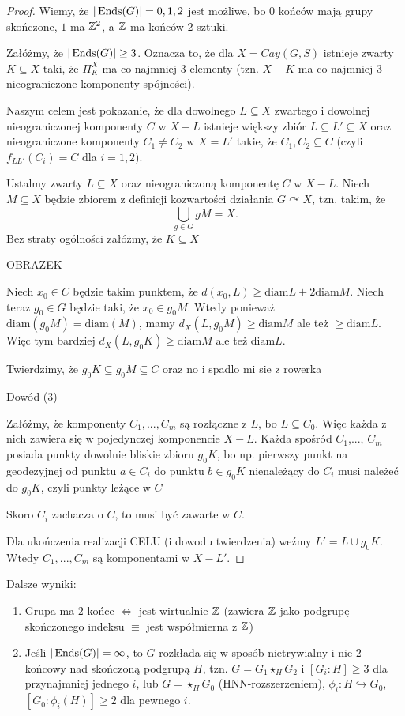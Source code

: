 \begin{proof}
  Wiemy, że $|\operatorname{Ends}(G)|=0,1,2$ jest możliwe, bo $0$ końców mają grupy skończone, $1$ ma $\mathbb{Z}^2$, a $\mathbb{Z}$ ma końców $2$ sztuki.

  Załóżmy, że $|\operatorname{Ends}(G)|\geq3$. Oznacza to, że dla $X=Cay(G, S)$ istnieje zwarty $K\subseteq X$ taki, że $\Pi_K^X$ ma co najmniej $3$ elementy (tzn. $X-K$ ma co najmniej $3$ nieograniczone komponenty spójności). 

  Naszym celem jest pokazanie, że dla dowolnego $L\subseteq X$ zwartego i dowolnej nieograniczonej komponenty $C$ w $X-L$ istnieje większy zbiór $L\subseteq L'\subseteq X$ oraz nieograniczone komponenty $C_1\neq C_2$ w $X=L'$ takie, że $C_1,C_2\subseteq C$ (czyli $f_{LL'}(C_i)=C$ dla $i=1,2$).

  Ustalmy zwarty $L\subseteq X$ oraz nieograniczoną komponentę $C$ w $X-L$. Niech $M\subseteq X$ będzie zbiorem z definicji kozwartości działania $G \curvearrowright X$, tzn. takim, że 
  $$\bigcup_{g\in G}gM=X.$$ 
  Bez straty ogólności załóżmy, że $K\subseteq X$ 

  {\Large\color{red}OBRAZEK}

  Niech $x_0\in C$ będzie takim punktem, że $d(x_0,L)\geq \text{diam}L+2\text{diam}M$. Niech teraz $g_0\in G$ będzie taki, że $x_0\in g_0M$. Wtedy ponieważ $\text{diam}(g_0M)=\text{diam}(M)$, mamy $d_X(L, g_0M)\geq \text{diam}M$ ale też $\geq\text{diam}L$. Więc tym bardziej $d_X(L, g_0K)\geq \text{diam}M$ ale też $\text{diam}L$.

  Twierdzimy, że $g_0K\subseteq g_0M\subseteq C$ oraz 
  {\Large\color{red}no i spadlo mi sie z rowerka}

  Dowód (3)

  Załóżmy, że komponenty $C_1,...,C_m$ są rozłączne z $L$, bo $L\subseteq C_0$. Więc każda z nich zawiera się w pojedynczej komponencie $X-L$. Każda spośród $C_1$,..., $C_m$ posiada punkty dowolnie bliskie zbioru $g_0K$, bo np. pierwszy punkt na geodezyjnej od punktu $a\in C_i$ do punktu $b\in g_0K$ nienależący do $C_i$  musi należeć do $g_0K$, czyli punkty leżące w $C$

  Skoro $C_i$ zachacza o $C$, to musi być zawarte w $C$.

  Dla ukończenia realizacji CELU (i dowodu twierdzenia) weźmy $L'=L\cup g_0K$. Wtedy $C_1,..., C_m$ są komponentami w $X-L'$.
\end{proof}

Dalsze wyniki:
\begin{enumerate}
  \item[\skull] Grupa ma $2$ końce $\iff$ jest wirtualnie $\mathbb{Z}$ (zawiera $\mathbb{Z}$ jako podgrupę skończonego indeksu $\equiv$ jest współmierna z $\mathbb{Z}$)
  \item[\skull] Jeśli $|\operatorname{Ends}(G)|=\infty$, to $G$ rozkłada się w sposób  nietrywialny i nie $2$-końcowy nad skończoną podgrupą $H$, tzn. $G=G_1\star_H G_2$ i $[G_i:H]\geq 3$ dla przynajmniej jednego $i$, lub $G=\star_H G_0$ (HNN-rozszerzeniem), $\phi_i:H\hookrightarrow G_0$, $[G_0:\phi_i(H)]\geq 2$ dla pewnego $i$.
\end{enumerate}


